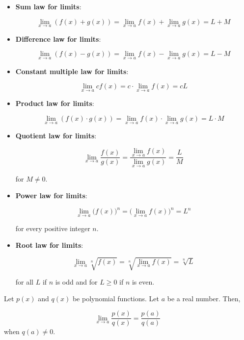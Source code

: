 \begin{itemize}[parsep=0pt, after=\vspace{0pt}]
\item
  \textbf{Sum law for limits}:

\[\lim\limits_{x\to a}(f(x)+g(x))=\lim\limits_{x\to a}f(x)+\lim\limits_{x\to a}g(x)=L+M\]

\item
  \textbf{Difference law for limits}:

\[\lim\limits_{x\to a}(f(x)-g(x))=\lim\limits_{x\to a}f(x)-\lim\limits_{x\to a}g(x)=L-M\]

\item
  \textbf{Constant multiple law for limits}:

\[\lim\limits_{x\to a}cf(x)=c\cdot \lim\limits_{x\to a}f(x)=cL\]

\item
  \textbf{Product law for limits}:

\[\lim\limits_{x\to a}(f(x)\cdot g(x))=\lim\limits_{x\to a}f(x)\cdot \lim\limits_{x\to a}g(x)=L\cdot M\]

\item
  \textbf{Quotient law for limits}:

\[\lim\limits_{x\to a}\frac{f(x)}{g(x)}=\frac{\lim\limits_{x\to a}f(x)}{\lim\limits_{x\to a}g(x)}=\frac{L}{M}\]

for \(M\neq 0\).

\item
  \textbf{Power law for limits}:

\[\lim\limits_{x\to a}\big(f(x)\big)^n=\big(\lim\limits_{x\to a}f(x)\big)^n=L^n\]

for every positive integer \(n\).

\item
  \textbf{Root law for limits}:
  
  \[\lim\limits_{x\to a}\sqrt[n]{f(x)}=\sqrt[n]{\lim\limits_{x\to a} f(x)}=\sqrt[n]{L}\]
  
  for all \(L\) if \(n\) is odd and for \(L\geq 0\) if \(n\) is even.
  
\end{itemize}



\begin{theorem}
  Let \(p(x)\) and \(q(x)\) be polynomial functions. Let \(a\) be a real
  number. Then,
  
  \[\lim\limits_{x\to a}\frac{p(x)}{q(x)}=\frac{p(a)}{q(a)}\] when
  \(q(a)\neq 0\).
\end{theorem}


